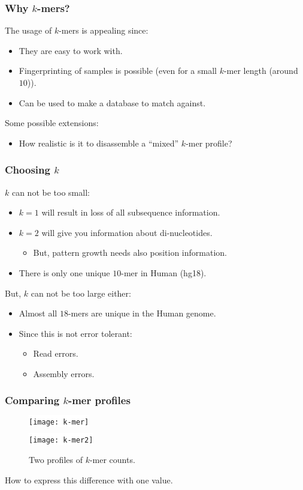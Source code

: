\documentclass[slidestop]{beamer}
\begin{document}
\begin{frame}
  \frametitle{Why $k$-mers?}

  The usage of $k$-mers is appealing since:
  \begin{itemize}
    \item They are easy to work with.
    \item Fingerprinting of samples is possible (even for a small $k$-mer
      length (around $10$)).
    \item Can be used to make a database to match against.
  \end{itemize}
  \bigskip
  \pause

  Some possible extensions:
  \begin{itemize}
    \item How realistic is it to disassemble a ``mixed'' $k$-mer profile?
  \end{itemize}
\end{frame}

\begin{frame}
  \frametitle{Choosing $k$}

  $k$ can not be too small:
  \pause
  \begin{itemize}
    \item $k = 1$ will result in loss of all subsequence information.
    \item $k = 2$ will give you information about di-nucleotides.
    \begin{itemize}
      \item But, pattern growth needs also position information.
    \end{itemize}
    \item There is only one unique $10$-mer in Human (hg18).
  \end{itemize}
  \bigskip
  \pause

  But, $k$ can not be too large either:
  \pause
  \begin{itemize}
    \item Almost all $18$-mers are unique in the Human genome.
    \item Since this is not error tolerant:
    \begin{itemize}
      \item Read errors.
      \item Assembly errors.
    \end{itemize}
  \end{itemize}
\end{frame}

\begin{frame}
  \frametitle{Comparing $k$-mer profiles}

  \vspace{-0.5cm}
  \begin{figure}
    \colorbox{white}{
      \texttt{[image: k-mer]}
    }
    \smallskip

    \colorbox{white}{
      \texttt{[image: k-mer2]}
    }
    \vspace{-0.5cm}
    \caption{Two profiles of $k$-mer counts.}
  \end{figure}
  \pause

  How to express this difference with one value.
\end{frame}
\end{document}
